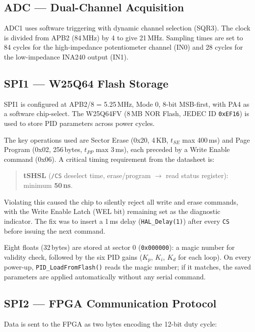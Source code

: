 \documentclass[12pt, a4paper]{report}
\begin{document}
\subsection{ADC — Dual-Channel Acquisition}

ADC1 uses software triggering with dynamic channel selection (SQR3). The
clock is divided from APB2 (84\,MHz) by 4 to give 21\,MHz. Sampling times
are set to 84 cycles for the high-impedance potentiometer channel (IN0) and
28 cycles for the low-impedance INA240 output (IN1).

\subsection{SPI1 — W25Q64 Flash Storage}

SPI1 is configured at APB2/8 = 5.25\,MHz, Mode 0, 8-bit MSB-first, with
PA4 as a software chip-select. The W25Q64FV (8\,MB NOR Flash, JEDEC ID
\texttt{0xEF16}) is used to store PID parameters across power cycles.

The key operations used are Sector Erase (0x20, 4\,KB, $t_{SE}$ max
400\,ms) and Page Program (0x02, 256\,bytes, $t_{PP}$ max 3\,ms), each
preceded by a Write Enable command (0x06). A critical timing requirement
from the datasheet is:

\begin{quote}
\textbf{tSHSL} (\texttt{/CS} deselect time, erase/program $\to$ read
status register): minimum \textbf{50\,ns}.
\end{quote}

Violating this caused the chip to silently reject all write and erase
commands, with the Write Enable Latch (WEL bit) remaining set as the
diagnostic indicator. The fix was to insert a 1\,ms delay
(\texttt{HAL\_Delay(1)}) after every \texttt{CS\,\textuparrow} before
issuing the next command.

Eight floats (32\,bytes) are stored at sector 0 (\texttt{0x000000}):
a magic number for validity check, followed by the six PID gains
($K_p$, $K_i$, $K_d$ for each loop). On every power-up,
\texttt{PID\_LoadFromFlash()} reads the magic number; if it matches, the
saved parameters are applied automatically without any serial command.

\subsection{SPI2 — FPGA Communication Protocol}

Data is sent to the FPGA as two bytes encoding the 12-bit duty cycle:
\end{document}
